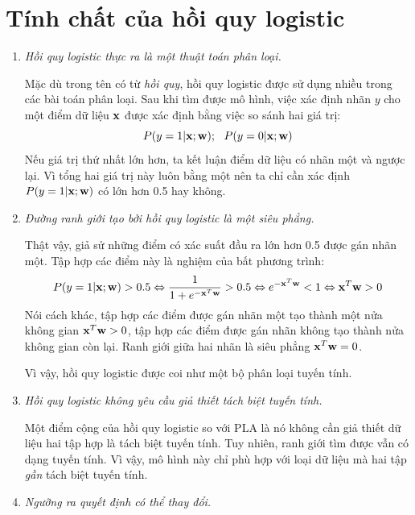 \section{Tính chất của hồi quy logistic}
\begin{enumerate}
\item \textit{Hồi quy logistic thực ra là một thuật toán phân loại.}

Mặc dù trong tên có từ \textit{hồi quy}, hồi quy logistic được sử dụng nhiều
trong các bài toán phân loại. Sau khi tìm được mô hình, việc xác định
nhãn $y$ cho một điểm dữ liệu $\mathbf{x}$ được xác định bằng việc so sánh
hai giá trị:
\begin{equation}
P(y = 1| \mathbf{x}; \mathbf{w}); ~~ P(y = 0| \mathbf{x}; \mathbf{w})
\end{equation}
Nếu giá trị thứ nhất lớn hơn, ta kết luận điểm dữ liệu có nhãn một và
ngược lại. Vì tổng hai giá trị này luôn bằng một nên ta chỉ cần xác định
$P(y = 1| \mathbf{x}; \mathbf{w})$ có lớn hơn 0.5 hay không.



\item \textit{Đường ranh giới tạo bởi hồi quy logistic là một siêu phẳng.}

Thật vậy, giả sử những điểm có xác suất đầu ra lớn hơn 0.5 được gán nhãn một. Tập hợp các điểm này là nghiệm của bất phương trình:
\begin{eqnarray*}
P(y = 1| \mathbf{x}; \mathbf{w}) > 0.5
\Leftrightarrow \frac{1}{1 + e^{-\mathbf{x}^T\mathbf{w}}} > 0.5
\Leftrightarrow e^{-\mathbf{x}^T\mathbf{w}} < 1
\Leftrightarrow \mathbf{x}^T\mathbf{w} > 0
\end{eqnarray*}
Nói cách khác, tập hợp các điểm được gán nhãn một tạo thành một nửa không gian $\mathbf{x}^T\mathbf{w} > 0$, tập hợp các điểm được gán nhãn không tạo thành nửa không gian còn lại. Ranh giới giữa hai nhãn là siêu phẳng $\mathbf{x}^T\mathbf{w} = 0$.

Vì vậy, hồi quy logistic được coi như một bộ phân loại tuyến tính.

\item \textit{Hồi quy logistic không yêu cầu giả thiết tách biệt tuyến tính.}

Một điểm cộng của hồi quy logistic so với PLA là nó không cần giả thiết dữ liệu hai tập hợp là tách biệt tuyến tính. Tuy nhiên, ranh giới tìm được vẫn có dạng tuyến tính. Vì vậy, mô hình này chỉ phù hợp với loại dữ liệu mà hai tập \textit{gần} tách biệt tuyến tính.

\item \textit{Ngưỡng ra quyết định có thể thay đổi.}


\end{enumerate}
